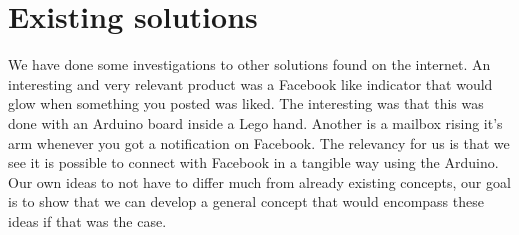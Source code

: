
\section{Existing solutions}

We have done some investigations to other solutions found on the internet.
An interesting and very relevant product was a Facebook like indicator
that would glow when something you posted was liked. The interesting
was that this was done with an Arduino board inside a Lego hand. Another
is a mailbox rising it’s arm whenever you got a notification on Facebook.
The relevancy for us is that we see it is possible to connect with
Facebook in a tangible way using the Arduino. Our own ideas to not
have to differ much from already existing concepts, our goal is to
show that we can develop a general concept that would encompass these
ideas if that was the case. 
